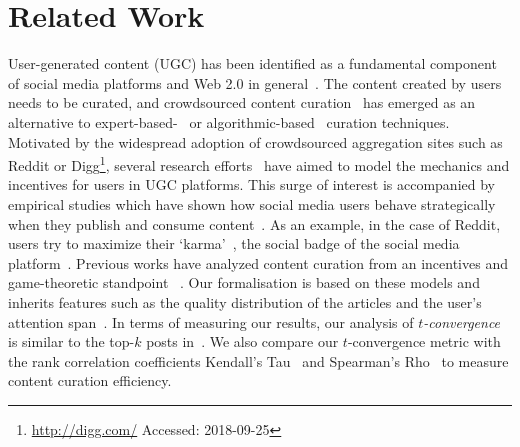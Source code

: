 \section{Related Work}
  User-generated content (UGC) has been identified as a fundamental component of social media platforms and Web 2.0 in general~\cite{kaplan2010users}. The content created by users needs to be curated, and crowdsourced content curation~\cite{askalidis2013theoretical} has emerged as an alternative to expert-based-~\cite{stanoevska2012content} or algorithmic-based~\cite{rader2015understanding} curation techniques. Motivated by the widespread adoption of crowdsourced aggregation sites such as Reddit or Digg\footnote{\url{http://digg.com/} Accessed: 2018-09-25}, several research efforts~\cite{das2010ranking,ghosh2011incentivizing,abbassi2014distributed} have aimed to model the mechanics and incentives for users in UGC platforms. This surge of interest is accompanied  by empirical studies which have shown how
social media users behave strategically when they publish and consume content~\cite{may2014filter}. As an example, in the case of Reddit, users try to maximize their `karma'~\cite{bergstrom2011don}, the social badge of the social media platform~\cite{anderson2013steering}.
Previous works have analyzed content curation from an incentives and game-theoretic standpoint~\cite{ghosh2011incentivizing,das2010ranking,gupte2009news,may2014filter,abbassi2014distributed} . Our formalisation is based on  these models and inherits features such as the quality distribution of the articles and the user's attention span~\cite{askalidis2013theoretical,ghosh2011incentivizing}. In terms of measuring our results,  our analysis of \textit{$t$-convergence} is similar to the top-$k$ posts in~\cite{askalidis2013theoretical}. We also compare our $t$-convergence metric with the rank correlation coefficients Kendall's Tau~\cite{kendall1955rank} and Spearman's Rho~\cite{spearman1904proof} to measure content curation efficiency.

